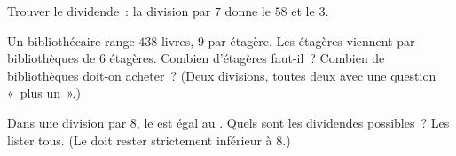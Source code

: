 \begin{exercise}[$\star$]\label{exo:g4:division:9}
Trouver le dividende~: la division par $7$ donne le  $58$
et le  $3$.
\end{exercise}

\begin{exercise}[$\star\star$]\label{exo:g4:division:10}
Un bibliothécaire range $438$ livres, $9$ par étagère. Les étagères
viennent par bibliothèques de $6$ étagères. Combien d'étagères
faut-il~? Combien de bibliothèques doit-on acheter~? (Deux
divisions, toutes deux avec une question «~plus un~».)
\end{exercise}

\begin{exercise}[$\star\star$]\label{exo:g4:division:11}
Dans une division par $8$, le  est égal au . Quels
sont les dividendes possibles~? Les lister tous. (Le  doit
rester strictement inférieur à $8$.)
\end{exercise}
